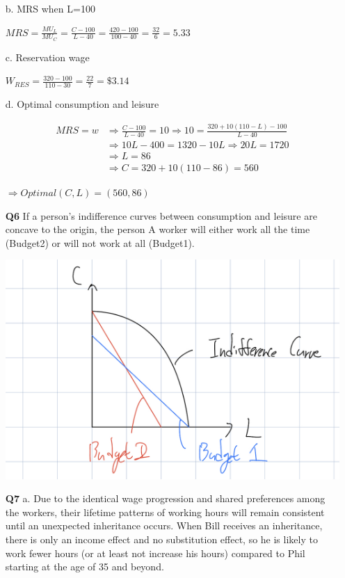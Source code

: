 \documentclass[12pt]{article}
\begin{document}
\begin{enumerate}
    b. MRS when L=100

    $MRS = \frac{MU_L}{MU_C} = \frac{C - 100}{L-40} = \frac{420 - 100}{100 - 40} = \frac{32}{6} = 5.33$

    c. Reservation wage

    $W_{RES} = \frac{320 - 100}{110-30} = \frac{22}{7} = \$3.14$

    d. Optimal consumption and leisure

    \begin{align*}
            MRS = w &\Rightarrow \frac{C - 100}{L - 40} = 10 \Rightarrow 10 = \frac{320 + 10(110 - L) -100}{L - 40}\\ &\Rightarrow 10L - 400 = 1320 - 10L \Rightarrow 20L = 1720\\
            &\Rightarrow L = 86\\
            &\Rightarrow C = 320 + 10(110 - 86) = 560
    \end{align*}

    $\Rightarrow Optimal (C,L) = (560, 86)$

    \item[\textbf{Q6}] 
    If a person's indifference curves between consumption and leisure are concave to the origin, the person A worker will either work all the time (Budget2) or will not work at all (Budget1). 

    \includegraphics[width=0.75\linewidth]{IMG_6025608848EA-1.jpeg}
        
    \item[\textbf{Q7}] 
    a. Due to the identical wage progression and shared preferences among the workers, their lifetime patterns of working hours will remain consistent until an unexpected inheritance occurs. When Bill receives an inheritance, there is only an income effect and no substitution effect, so he is likely to work fewer hours (or at least not increase his hours) compared to Phil starting at the age of 35 and beyond.


\end{enumerate}
\end{document}
